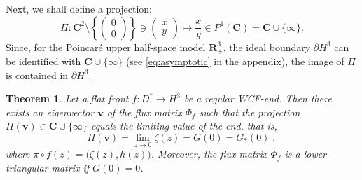 \documentclass[a4paper]{amsart}
\theoremstyle{plain}
\newtheorem{theorem}{Theorem}[section]
\theoremstyle{remark}
\numberwithin{equation}{section}
\begin{document}
Next, we shall define a projection:
\begin{equation}\label{eq:c-2-proj}
   \Pi:{\boldsymbol{C}}^2 \setminus \left\{\begin{pmatrix}
			   0 \\ 0
	  		  \end{pmatrix}\right\} 
    \ni \begin{pmatrix}     x \\ y \end{pmatrix}
    \longmapsto \frac{x}y\in P^1({\boldsymbol{C}})={\boldsymbol{C}}\cup\{\infty\}  .
\end{equation}
Since, for the Poincar\'e upper half-space model
${\boldsymbol{R}}_+^3$, the ideal boundary $\partial H^3$
can be identified with ${\boldsymbol{C}}\cup \{\infty\}$
(see \eqref{eq:asymptotic} in the appendix),
the image of $\Pi$ is contained in $\partial H^3$.
\begin{theorem}\label{thm:limit}
 Let a flat front $f \colon D^*\to H^3$ be a regular WCF-end. 
 Then there exists an eigenvector
 ${\boldsymbol{{v}}}$ of the flux matrix $\Phi_f$ such that
 the projection $\Pi({\boldsymbol{{v}}})\in {\boldsymbol{C}}\cup\{\infty\}$
 equals the limiting value of the end, 
 that is, 
 \[
    \Pi({\boldsymbol{{v}}}) =\lim_{z\to 0} \zeta(z)=G(0)=G_*(0) \; , 
 \]
 where $\pi\circ f(z) =\bigl(\zeta(z), h(z)\bigr)$. 
 Moreover, the flux matrix $\Phi_f$ is a lower triangular matrix if
 $G(0)=0$.
\end{theorem}
\end{document}
